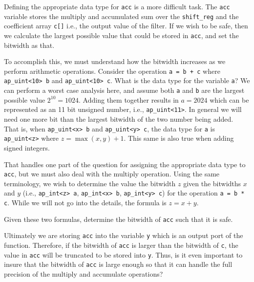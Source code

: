 Defining the appropriate data type for \lstinline{acc} is a more difficult task. The \lstinline{acc} variable stores the multiply and accumulated sum over the \lstinline{shift_reg} and the coefficient array \lstinline{c[]} i.e., the output value of the filter. If we wish to be safe, then we calculate the largest possible value that could be stored in \lstinline{acc}, and set the bitwidth as that. 

To accomplish this, we must understand how the bitwidth increases as we perform arithmetic operations. Consider the operation \lstinline{a = b + c} where \lstinline{ap_uint<10> b} and \lstinline{ap_uint<10> c}. What is the data type for the variable \lstinline{a}? We can perform a worst case analysis here, and assume both \lstinline{a} and \lstinline{b} are the largest possible value $2^{10} = 1024$. Adding them together results in $a = 2024$ which can be represented as an 11 bit unsigned number, i.e., \lstinline{ap_uint<11>}. In general we will need one more bit than the largest bitwidth of the two number being added. That is, when  \lstinline{ap_uint<x> b} and \lstinline{ap_uint<y> c}, the data type for \lstinline{a} is \lstinline{ap_uint<z>} where $z = \max(x,y) + 1$. This same is also true when adding signed integers. 

That handles one part of the question for assigning the appropriate data type to \lstinline{acc}, but we must also deal with the multiply operation. Using the same terminology, we wish to determine the value the bitwidth $z$ given the bitwidths $x$ and $y$ (i.e., \lstinline{ap_int<z> a}, \lstinline{ap_int<x> b}, \lstinline{ap_int<y> c}) for the operation \lstinline{a = b * c}. While we will not go into the details, the formula is $z = x + y$. 

\begin{exercise}
Given these two formulas, determine the bitwidth of \lstinline{acc} such that it is safe.
\end{exercise}

Ultimately we are storing \lstinline{acc} into the variable \lstinline{y} which is an output port of the function. Therefore, if the bitwidth of \lstinline{acc} is larger than the bitwidth of \lstinline{c}, the value in \lstinline{acc} will be truncated to be stored into \lstinline{y}. Thus, is it even important to insure that the bitwidth of \lstinline{acc} is large enough so that it can handle the full precision of the multiply and accumulate operations? 

